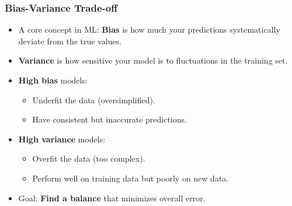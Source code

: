 \documentclass[aspectratio=169]{beamer}
\begin{document}

\begin{frame}
    \frametitle{Bias-Variance Trade-off}
    \begin{itemize}
        \item A core concept in ML: \textbf{Bias} is how much your predictions systematically deviate from the true values.
        \item \textbf{Variance} is how sensitive your model is to fluctuations in the training set.
        \item \textbf{High bias} models:
            \begin{itemize}
                \item Underfit the data (oversimplified).
                \item Have consistent but inaccurate predictions.
            \end{itemize}
        \item \textbf{High variance} models:
            \begin{itemize}
                \item Overfit the data (too complex).
                \item Perform well on training data but poorly on new data.
            \end{itemize}
        \item Goal: \textbf{Find a balance} that minimizes overall error.
    \end{itemize}
\end{frame}
\end{document}
